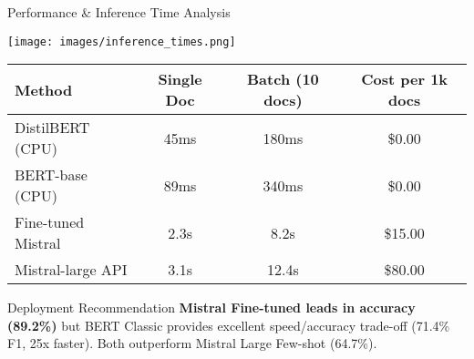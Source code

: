 \documentclass[aspectratio=169]{beamer}
\begin{document}
\begin{frame}{Performance \& Inference Time Analysis}
\begin{center}
\texttt{[image: images/inference\_times.png]}
\end{center}

\begin{table}[h]
\centering
\begin{tabular}{lccc}
\toprule
\textbf{Method} & \textbf{Single Doc} & \textbf{Batch (10 docs)} & \textbf{Cost per 1k docs} \\
\midrule
DistilBERT (CPU) & 45ms & 180ms & \$0.00 \\
BERT-base (CPU) & 89ms & 340ms & \$0.00 \\
Fine-tuned Mistral & 2.3s & 8.2s & \$15.00 \\
Mistral-large API & 3.1s & 12.4s & \$80.00 \\
\bottomrule
\end{tabular}
\end{table}

\begin{alertblock}{Deployment Recommendation}
\textbf{Mistral Fine-tuned leads in accuracy (89.2\%)} but BERT Classic provides excellent speed/accuracy trade-off (71.4\% F1, 25x faster). Both outperform Mistral Large Few-shot (64.7\%).
\end{alertblock}
\end{frame}
\end{document}
